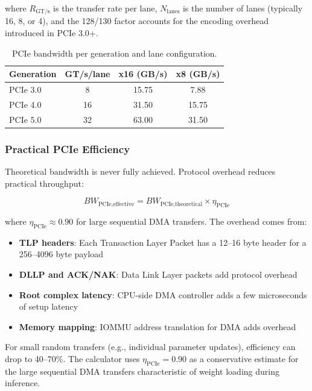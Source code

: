 \documentclass[11pt,a4paper]{article}
\theoremstyle{definition}
\begin{document}
where $R_{\text{GT/s}}$ is the transfer rate per lane, $N_{\text{lanes}}$ is the number of lanes (typically 16, 8, or 4), and the 128/130 factor accounts for the encoding overhead introduced in PCIe 3.0+.

\begin{table}[htbp]
\centering
\caption{PCIe bandwidth per generation and lane configuration.}\label{tab:pcie}
\begin{tabular}{lccc}
\toprule
\textbf{Generation} & \textbf{GT/s/lane} & \textbf{x16 (GB/s)} & \textbf{x8 (GB/s)} \\
\midrule
PCIe 3.0 & 8  & 15.75 & 7.88 \\
PCIe 4.0 & 16 & 31.50 & 15.75 \\
PCIe 5.0 & 32 & 63.00 & 31.50 \\
\bottomrule
\end{tabular}
\end{table}

\subsubsection{Practical PCIe Efficiency}

Theoretical bandwidth is never fully achieved. Protocol overhead reduces practical throughput:

\begin{equation}\label{eq:pcie_effective}
BW_{\text{PCIe,effective}} = BW_{\text{PCIe,theoretical}} \times \eta_{\text{PCIe}}
\end{equation}

where $\eta_{\text{PCIe}} \approx 0.90$ for large sequential DMA transfers. The overhead comes from:
\begin{itemize}
  \item \textbf{TLP headers}: Each Transaction Layer Packet has a 12--16 byte header for a 256--4096 byte payload
  \item \textbf{DLLP and ACK/NAK}: Data Link Layer packets add protocol overhead
  \item \textbf{Root complex latency}: CPU-side DMA controller adds a few microseconds of setup latency
  \item \textbf{Memory mapping}: IOMMU address translation for DMA adds overhead
\end{itemize}

For small random transfers (e.g., individual parameter updates), efficiency can drop to 40--70\%. The calculator uses $\eta_{\text{PCIe}} = 0.90$ as a conservative estimate for the large sequential DMA transfers characteristic of weight loading during inference.
\end{document}
